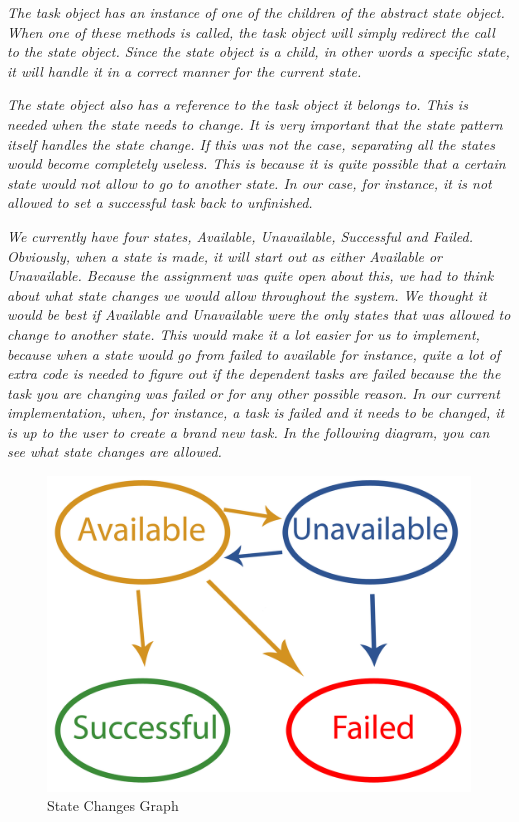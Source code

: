 				\emph{The task object has an instance of one of the children of the abstract state object. When one of these methods is called, the task object will simply redirect the call to the state object. Since the state object is a child, in other words a specific state, it will handle it in a correct manner for the current state.} 
			
				\emph{The state object also has a reference to the task object it belongs to. This is needed when the state needs to change. It is very important that the state pattern itself handles the state change. If this was not the case, separating all the states would become completely useless. This is because it is quite possible that a certain state would not allow to go to another state. In our case, for instance, it is not allowed to set a successful task back to unfinished.}
			
				\emph{We currently have four states, Available, Unavailable, Successful and Failed. Obviously, when a state is made, it will start out as either Available or Unavailable. Because the assignment was quite open about this, we had to think about what state changes we would allow throughout the system. We thought it would be best if Available and Unavailable were the only states that was allowed to change to another state. This would make it a lot easier for us to implement, because when a state would go from failed to available for instance, quite a lot of extra code is needed to figure out if the dependent tasks are failed because the the task you are changing was failed or for any other possible reason. In our current implementation, when, for instance, a task is failed and it needs to be changed, it is up to the user to create a brand new task. In the following diagram, you can see what state changes are allowed.}
				\begin{figure}[H]
					\begin{center}
						\includegraphics[scale=0.7]{images/StateChanges.png}
					\end{center}
					\caption{State Changes Graph}

				\end{figure}
			
